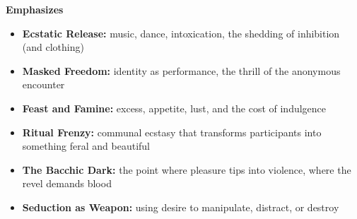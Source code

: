 \noindent\textbf{Emphasizes}
\begin{itemize}
  \item \textbf{Ecstatic Release:} music, dance, intoxication, the shedding of inhibition (and clothing)
  \item \textbf{Masked Freedom:} identity as performance, the thrill of the anonymous encounter
  \item \textbf{Feast and Famine:} excess, appetite, lust, and the cost of indulgence
  \item \textbf{Ritual Frenzy:} communal ecstasy that transforms participants into something feral and beautiful
  \item \textbf{The Bacchic Dark:} the point where pleasure tips into violence, where the revel demands blood
  \item \textbf{Seduction as Weapon:} using desire to manipulate, distract, or destroy
\end{itemize}

